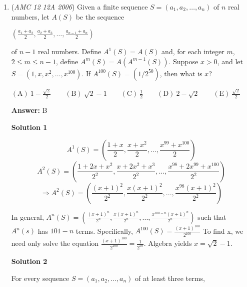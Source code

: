 \begin{enumerate}
 If we draw the altitude of $APO$ from $P$, then we get a \href{https://artofproblemsolving.com/wiki/index.php?title=Right\_triangle}{right triangle}. Using simple trigonometry, $\cos 15^{\circ} = \frac{\frac{r}{2}}{2\sqrt{3}} = \frac{r}{4\sqrt{3}}$.

 Since $\cos 15^{\circ} = \cos (45^{\circ} - 30^{\circ}) = \frac{\sqrt{6} + \sqrt{2}}{4}$, we get $r = \left(\frac{\sqrt{6} + \sqrt{2}}{4}\right) \cdot 4\sqrt{3} = 3\sqrt{2} + \sqrt{6} \Rightarrow \boxed{D}$.

 


	\item (\textit{AMC 12 12A 2006}) Given a finite sequence $S=(a_1,a_2,\ldots ,a_n)$ of $n$ real numbers, let $A(S)$ be the sequence 


 $\left(\frac{a_1+a_2}{2},\frac{a_2+a_3}{2},\ldots ,\frac{a_{n-1}+a_n}{2}\right)$


 of $n-1$ real numbers. Define $A^1(S)=A(S)$ and, for each integer $m$, $2\le m\le n-1$, define $A^m(S)=A(A^{m-1}(S))$. Suppose $x>0$, and let $S=(1,x,x^2,\ldots ,x^{100})$. If $A^{100}(S)=(1/2^{50})$, then what is $x$?


 $\mathrm{(A) \ } 1-\frac{\sqrt{2}}{2}\qquad \mathrm{(B) \ } \sqrt{2}-1\qquad \mathrm{(C) \ } \frac{1}{2}\qquad \mathrm{(D) \ } 2-\sqrt{2}\qquad \mathrm{(E) \ }  \frac{\sqrt{2}}{2}$

 \textbf{Answer: }B



\textbf{Solution 1}


 \[A^1(S)=\left(\frac{1+x}{2},\frac{x+x^2}{2},...,\frac{x^{99}+x^{100}}{2}\right)\]
 \[A^2(S)=\left(\frac{1+2x+x^2}{2^2},\frac{x+2x^2+x^3}{2^2},...,\frac{x^{98}+2x^{99}+x^{100}}{2^2}\right)\]
 \[\Rightarrow A^2(S)=\left(\frac{(x+1)^2}{2^2},\frac{x(x+1)^2}{2^2},...,\frac{x^{98}(x+1)^2}{2^2}\right)\]

 In general, $A^n(S)=\left(\frac{(x+1)^n}{2^n},\frac{x(x+1)^n}{2^n},...,\frac{x^{100-n}(x+1)^n}{2^n}\right)$ such that $A^n(s)$ has $101-n$ terms. Specifically, $A^{100}(S)=\frac{(x+1)^{100}}{2^{100}}$ To find x, we need only solve the equation $\frac{(x+1)^{100}}{2^{100}}=\frac{1}{2^{50}}$. Algebra yields $x=\sqrt{2}-1$.

 



\textbf{Solution 2}

For every sequence $S=\left(a_1,a_2,\dots, a_n\right)$ of at least three terms,


\end{enumerate}
